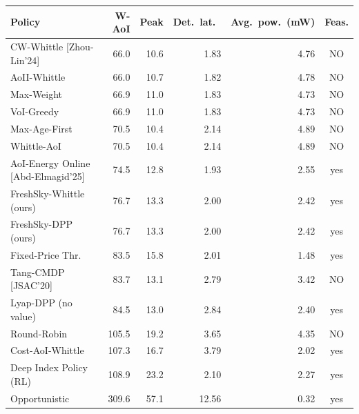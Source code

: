 \begin{tabular}{lrrrrc}
\hline
Policy & W-AoI & Peak & Det.\ lat.\ & Avg.\ pow.\ (mW) & Feas.\\
\hline
CW-Whittle [Zhou-Lin'24] & 66.0 & 10.6 & 1.83 & 4.76 & NO\\
AoII-Whittle & 66.0 & 10.7 & 1.82 & 4.78 & NO\\
Max-Weight & 66.9 & 11.0 & 1.83 & 4.73 & NO\\
VoI-Greedy & 66.9 & 11.0 & 1.83 & 4.73 & NO\\
Max-Age-First & 70.5 & 10.4 & 2.14 & 4.89 & NO\\
Whittle-AoI & 70.5 & 10.4 & 2.14 & 4.89 & NO\\
AoI-Energy Online [Abd-Elmagid'25] & 74.5 & 12.8 & 1.93 & 2.55 & yes\\
FreshSky-Whittle (ours) & 76.7 & 13.3 & 2.00 & 2.42 & yes\\
FreshSky-DPP (ours) & 76.7 & 13.3 & 2.00 & 2.42 & yes\\
Fixed-Price Thr. & 83.5 & 15.8 & 2.01 & 1.48 & yes\\
Tang-CMDP [JSAC'20] & 83.7 & 13.1 & 2.79 & 3.42 & NO\\
Lyap-DPP (no value) & 84.5 & 13.0 & 2.84 & 2.40 & yes\\
Round-Robin & 105.5 & 19.2 & 3.65 & 4.35 & NO\\
Cost-AoI-Whittle & 107.3 & 16.7 & 3.79 & 2.02 & yes\\
Deep Index Policy (RL) & 108.9 & 23.2 & 2.10 & 2.27 & yes\\
Opportunistic & 309.6 & 57.1 & 12.56 & 0.32 & yes\\
\hline
\end{tabular}
